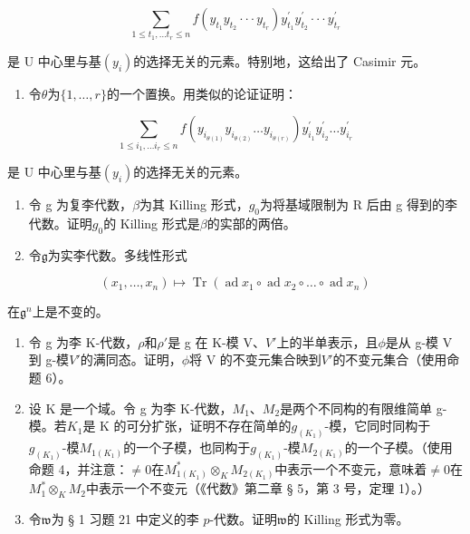 \[
\sum_ {1 \leqslant t _ {1}, \dots t _ {r} \leqslant n} f (y _ {t _ {1}} y _ {t _ {2}} \cdot \cdot \cdot y _ {t _ {r}}) y _ {t _ {1}} ^ {\prime} y _ {t _ {2}} ^ {\prime} \cdot \cdot \cdot y _ {t _ {r}} ^ {\prime}
\]

是 U 中心里与基\((y_{i})\)的选择无关的元素。特别地，这给出了 Casimir 元。

\begin{enumerate}
\def\labelenumi{(\alph{enumi})}
\setcounter{enumi}{4}
\tightlist
\item
  令\(\theta\)为\(\{1, \ldots, r\}\)的一个置换。用类似的论证证明：
\end{enumerate}

\[
\sum_ {1 \leqslant i _ {1}, \dots i _ {r} \leqslant n} f (y _ {i _ {\theta (1)}} y _ {i _ {\theta (2)}} \dots y _ {i _ {\theta (r)}}) y _ {i _ {1}} ^ {\prime} y _ {i _ {2}} ^ {\prime} \dots y _ {i _ {r}} ^ {\prime}
\]

是 U 中心里与基\((y_{i})\)的选择无关的元素。

\begin{enumerate}
\def\labelenumi{\arabic{enumi}.}
\setcounter{enumi}{6}
\item
  令 g 为复李代数，\(\beta\)为其 Killing 形式，\(g_{0}\)为将基域限制为 R 后由 g 得到的李代数。证明\(g_{0}\)的 Killing 形式是\(\beta\)的实部的两倍。
\item
  令\(\mathfrak{g}\)为实李代数。多线性形式
\end{enumerate}

\[
(x _ {1}, \dots , x _ {n}) \mapsto \operatorname{Tr} (\operatorname{ad} x _ {1} \circ \operatorname{ad} x _ {2} \circ \dots \circ \operatorname{ad} x _ {n})
\]

在\(\mathfrak{g}^n\)上是不变的。

\begin{enumerate}
\def\labelenumi{\arabic{enumi}.}
\setcounter{enumi}{8}
\item
  令 g 为李 K-代数，\(\rho\)和\(\rho'\)是 g 在 K-模 V、\(V'\)上的半单表示，且\(\phi\)是从 g-模 V 到 g-模\(V'\)的满同态。证明，\(\phi\)将 V 的不变元集合映到\(V'\)的不变元集合（使用命题 6）。
\item
  设 K 是一个域。令 g 为李 K-代数，\(M_{1}\)、\(M_{2}\)是两个不同构的有限维简单 g-模。若\(K_{1}\)是 K 的可分扩张，证明不存在简单的\(g_{(K_{1})}\)-模，它同时同构于\(g_{(K_{1})}\)-模\(M_{1(K_{1})}\)的一个子模，也同构于\(g_{(K_{1})}\)-模\(M_{2(K_{1})}\)的一个子模。（使用命题 4，并注意：\(\neq0\)在\(M_{1(K_{1})}^{*}\otimes_{K}M_{2(K_{1})}\)中表示一个不变元，意味着\(\neq0\)在\(M_{1}^{*}\otimes_{K}M_{2}\)中表示一个不变元（《代数》第二章 § 5，第 3 号，定理 1）。）
\item
  令\(\mathfrak{w}\)为 § 1 习题 21 中定义的李 \(p\)-代数。证明\(\mathfrak{w}\)的 Killing 形式为零。
\end{enumerate}

